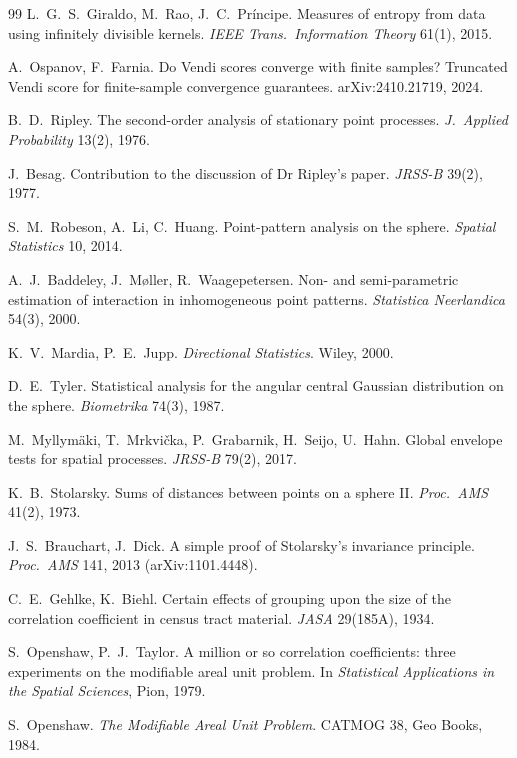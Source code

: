 \documentclass[11pt,letterpaper]{article}
\begin{document}
\begin{thebibliography}{99}
 L.~G.~S.~Giraldo, M.~Rao, J.~C.~Pr\'incipe. Measures
of entropy from data using infinitely divisible kernels. \emph{IEEE Trans.\
Information Theory} 61(1), 2015.

 A.~Ospanov, F.~Farnia. Do Vendi scores converge with
finite samples? Truncated Vendi score for finite-sample convergence
guarantees. arXiv:2410.21719, 2024.

 B.~D.~Ripley. The second-order analysis of stationary
point processes. \emph{J.\ Applied Probability} 13(2), 1976.

 J.~Besag. Contribution to the discussion of Dr Ripley's
paper. \emph{JRSS-B} 39(2), 1977.

 S.~M.~Robeson, A.~Li, C.~Huang. Point-pattern analysis
on the sphere. \emph{Spatial Statistics} 10, 2014.

 A.~J.~Baddeley, J.~M{\o}ller, R.~Waagepetersen.
Non- and semi-parametric estimation of interaction in inhomogeneous point
patterns. \emph{Statistica Neerlandica} 54(3), 2000.

 K.~V.~Mardia, P.~E.~Jupp. \emph{Directional
Statistics}. Wiley, 2000.

 D.~E.~Tyler. Statistical analysis for the angular
central Gaussian distribution on the sphere. \emph{Biometrika} 74(3),
1987.

 M.~Myllym\"aki, T.~Mrkvi\v{c}ka, P.~Grabarnik,
H.~Seijo, U.~Hahn. Global envelope tests for spatial processes.
\emph{JRSS-B} 79(2), 2017.

 K.~B.~Stolarsky. Sums of distances between points on
a sphere II. \emph{Proc.\ AMS} 41(2), 1973.

 J.~S.~Brauchart, J.~Dick. A simple proof of
Stolarsky's invariance principle. \emph{Proc.\ AMS} 141, 2013
(arXiv:1101.4448).

 C.~E.~Gehlke, K.~Biehl. Certain effects of grouping
upon the size of the correlation coefficient in census tract material.
\emph{JASA} 29(185A), 1934.

 S.~Openshaw, P.~J.~Taylor. A million or so
correlation coefficients: three experiments on the modifiable areal unit
problem. In \emph{Statistical Applications in the Spatial Sciences}, Pion,
1979.

 S.~Openshaw. \emph{The Modifiable Areal Unit
Problem}. CATMOG 38, Geo Books, 1984.


\end{thebibliography}
\end{document}
